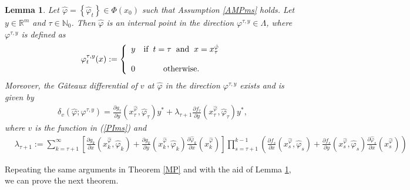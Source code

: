 \documentclass[3p]{elsarticle}
\newcommand{\rzm}{\mathbb R^{m}}
\newcommand{\nat}{\mathbb N_0}
\newtheorem{lem}[thm]{Lemma}
\begin{document}
	\begin{lem}\label{DVms}
		Let  $\hat \varphi=\left\lbrace \hat \varphi_t\right\rbrace \in \varPhi(x_0)$ such that  Assumption \ref{AMPms} holds. Let $y\in\rzm$ and $\tau\in\nat$. Then $\hat\varphi$ is an internal point in the direction $\varphi^{\tau,y}\in\Lambda$, where $\varphi^{\tau,y}$ is defined as
		\begin{align*}
		\varphi^{\tau,y}_t(x):=\left\{ \begin{array}{lcc}
		\displaystyle y & \text{if}\hspace{0.2cm}  t=\tau\hspace{0.2cm} \text{and} \hspace{0.2cm}x=x_\tau^{\hat\varphi} \\
		\\ 0 &\text{otherwise}. \\
		\end{array}
		\right.
		\end{align*}
		Moreover, the G\^ ateaux differential of $v$ at $\hat\varphi$ in the direction $\varphi^{\tau,y}$ exists and is given by 
		\begin{align*}
		\delta_v(\hat\varphi;\varphi^{\tau,y})=\frac{\partial g_\tau}{\partial y}(x_\tau^{\hat{\varphi}},\hat\varphi_\tau)y^*+ \lambda_{\tau+1}\frac{\partial f_\tau}{\partial y}(x_\tau^{\hat{\varphi}},\hat\varphi_\tau)y^*,
		\end{align*} 
		where $v$ is the function in (\ref{PIms}) and 
		\begin{align*}
		&\lambda_{\tau+1}:=\sum_{k=\tau+1}^\infty\left[ \frac{\partial g_k}{\partial x}\left( x_k^{\hat\varphi},\hat \varphi_k\right)+\frac{\partial g_k}{\partial y}\left( x_k^{\hat\varphi},\hat \varphi_k\right)\frac{\partial \hat\varphi_k}{\partial x}\left(x_k^{\hat\varphi}\right)\right]\prod_{s=\tau+1}^{k-1}\left(  \frac{\partial f_s}{\partial x}\left( x_s^{\hat\varphi},\hat \varphi_s\right)+\frac{\partial f_s}{\partial y}\left( x_s^{\hat\varphi},\hat \varphi_s\right)\frac{\partial \hat\varphi_s}{\partial x}\left(x_s^{\hat\varphi}\right)\right)
		\end{align*}
	\end{lem} 
	Repeating the same arguments in Theorem \ref{MP} and with the aid of Lemma \ref{DVms}, we can prove the next theorem.
\end{document}
